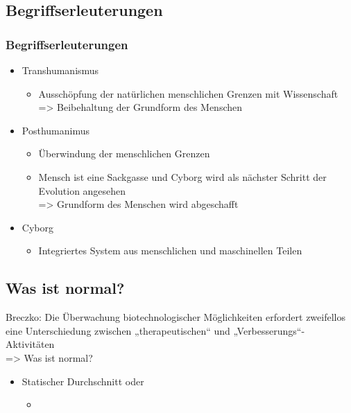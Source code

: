 \documentclass[aspectratio=169,16pt,xcolor=table]{beamer}
\begin{document}
\subsection{Begriffserleuterungen}
\begin{frame}
	\frametitle{Begriffserleuterungen}
	\begin{itemize}
	  \item Transhumanismus
    \begin{itemize}
      \item Ausschöpfung der natürlichen menschlichen Grenzen mit Wissenschaft~\cite{Merzlyakov2022}\\
      => Beibehaltung der Grundform des Menschen
    \end{itemize}
	\item Posthumanimus
    \begin{itemize}
      \item Überwindung der menschlichen Grenzen~\cite{Merzlyakov2022}\\
      \item Mensch ist eine Sackgasse und Cyborg wird als nächster Schritt der Evolution angesehen~\cite{Merzlyakov2022}\\
      => Grundform des Menschen wird abgeschafft
    \end{itemize}
	\item Cyborg
    \begin{itemize}
      \item Integriertes System aus menschlichen und maschinellen Teilen~\cite{warwick2000cyborg}
    \end{itemize}
	\end{itemize}
\end{frame}

\subsection{Was ist normal?}
\begin{frame}
  Breczko: Die Überwachung biotechnologischer Möglichkeiten erfordert zweifellos eine Unterschiedung zwischen „therapeutischen“ und „Verbesserungs“-Aktivitäten~\cite{breczko2021human}\\
  => Was ist normal?
\end{frame}

\begin{frame}
	\begin{itemize}
	  \item Statischer Durchschnitt oder 
    \begin{itemize}
      \item 
    \end{itemize}
  \end{itemize}
\end{frame}
\end{document}
